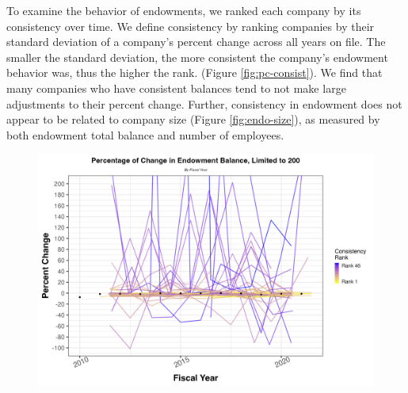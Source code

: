 \documentclass[Dance Data
Project,article,submit,moreauthors,pdftex]{mdpi}
\begin{document}
To examine the behavior of endowments, we ranked each company by its
consistency over time. We define consistency by ranking companies by
their standard deviation of a company's percent change across all years
on file. The smaller the standard deviation, the more consistent the
company's endowment behavior was, thus the higher the rank. (Figure
\ref{fig:pc-consist}). We find that many companies who have consistent
balances tend to not make large adjustments to their percent change.
Further, consistency in endowment does not appear to be related to
company size (Figure \ref{fig:endo-size}), as measured by both endowment
total balance and number of employees.

\begin{figure}[H]
\includegraphics[width=0.9\linewidth,]{../images/pc_consist} \caption{\label{fig:pc-consist}}\label{fig:unnamed-chunk-10}
\end{figure}
\end{document}
